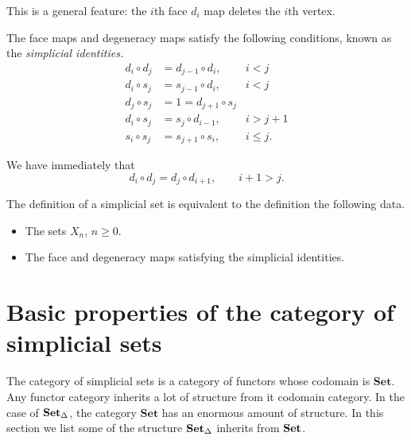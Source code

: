 \documentclass[main.tex]{subfiles}
\begin{document}
This is a general feature: the $i$th face $d_{i}$ map deletes the $i$th vertex.

\begin{theorem}
  \label{thm:simplicial_identities}
  The face maps and degeneracy maps satisfy the following conditions, known as the \emph{simplicial identities.}
  \begin{align*}
    d_{i} \circ d_{j} &= d_{j - 1} \circ d_{i},&i < j \\
    d_{i} \circ s_{j} &= s_{j-1} \circ d_{i}, &i < j \\
    d_{j} \circ s_{j} &= 1 = d_{j+1} \circ s_{j} \\
    d_{i} \circ s_{j} &= s_{j} \circ d_{i-1}, &i > j + 1 \\
    s_{i} \circ s_{j} &= s_{j+1} \circ s_{i}, &i \leq j.
  \end{align*}
\end{theorem}

\begin{corollary}
  We have immediately that
  \begin{equation*}
    d_{i} \circ d_{j} = d_{j} \circ d_{i+1},\qquad i+1 > j.
  \end{equation*}
\end{corollary}

\begin{fact}
  The definition of a simplicial set is equivalent to the definition the following data.
  \begin{itemize}
    \item The sets $X_{n}$, $n \geq 0$.
    \item The face and degeneracy maps satisfying the simplicial identities.
  \end{itemize}
\end{fact}

\section{Basic properties of the category of simplicial sets}
\label{sec:basic_properties_of_the_category_of_simplicial_sets}

The category of simplicial sets is a category of functors whose codomain is $\mathbf{Set}$. Any functor category inherits a lot of structure from it codomain category. In the case of $\operatorname{\mathbf{Set}_{\Delta}}$, the category $\mathbf{Set}$ has an enormous amount of structure. In this section we list some of the structure $\operatorname{\mathbf{Set}_{\Delta}}$ inherits from $\mathbf{Set}$.
\end{document}
